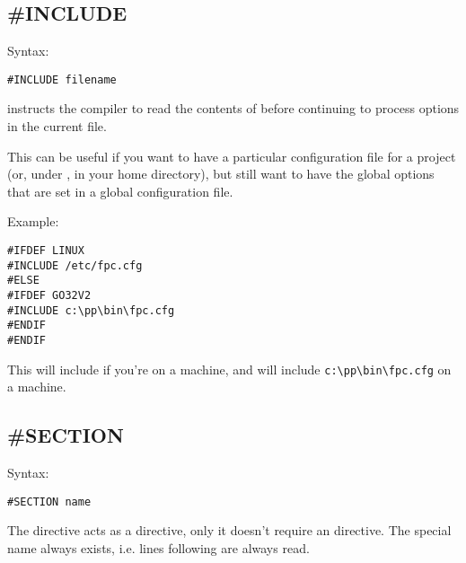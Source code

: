 \subsection{\#INCLUDE}
Syntax:
\begin{verbatim}
#INCLUDE filename
\end{verbatim}
 instructs the compiler to read the contents of
 before continuing to process options in the current file.

This can be useful if you want to have a particular configuration file
for a project (or, under \linux, in your home directory), but still want to
have the global options that are set in a global configuration file.

Example:
\begin{verbatim}
#IFDEF LINUX
#INCLUDE /etc/fpc.cfg
#ELSE
#IFDEF GO32V2
#INCLUDE c:\pp\bin\fpc.cfg
#ENDIF
#ENDIF
\end{verbatim}
This will include  if you're on a \linux machine,
and will include \verb+c:\pp\bin\fpc.cfg+
on a \dos machine.

\subsection{\#SECTION}
Syntax:
\begin{verbatim}
#SECTION name
\end{verbatim}
The  directive acts as a  directive, only
it doesn't require an  directive. The special name 
always exists, i.e. lines following  are always read.

